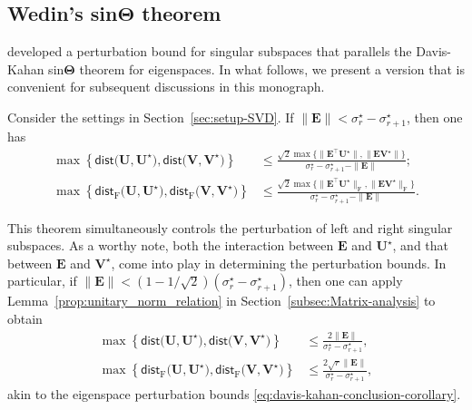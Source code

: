 \subsection{Wedin's sin$\bm\Theta$ theorem}

\citet{wedin1972perturbation} developed a perturbation bound for singular subspaces that parallels the Davis-Kahan sin$\bm{\Theta}$ theorem for eigenspaces. In what follows, we present a version that is convenient for subsequent discussions in this monograph.
%
\begin{theorem}
\label{thm:wedin}
Consider the settings in Section~\ref{sec:setup-SVD}. If $\|\bm{E}\|<\sigma_{r}^{\star}-\sigma_{r+1}^{\star}$, then one has
%
\begin{align*}
\max\left\{ \mathsf{dist}\big(\bm{U},\bm{U}^{\star}\big),\mathsf{dist}\big(\bm{V},\bm{V}^{\star}\big)\right\}
	& \leq\frac{ \sqrt{2} \max\big\{ \|\bm{E}^{\top}\bm{U}^{\star}\|,\|\bm{E}\bm{V}^{\star}\|\big\} }{\sigma_{r}^{\star}-\sigma_{r+1}^{\star}-\|\bm{E}\|};\\
\max\left\{ \mathsf{dist}_{\mathrm{F}}\big(\bm{U},\bm{U}^{\star}\big),\mathsf{dist}_{\mathrm{F}}\big(\bm{V},\bm{V}^{\star}\big)\right\}
	& \leq\frac{\sqrt{2}\max\big\{ \|\bm{E}^{\top}\bm{U}^{\star}\|_{\mathrm{F}},\|\bm{E}\bm{V}^{\star}\|_{\mathrm{F}}\big\} }{\sigma_{r}^{\star}-\sigma_{r+1}^{\star}-\|\bm{E}\|}.
\end{align*}
%
\end{theorem}




This theorem simultaneously controls the perturbation of left and right singular subspaces. As a worthy note, both the interaction between $\bm{E}$ and $\bm{U}^{\star}$, and that between $\bm{E}$ and $\bm{V}^{\star}$, come into play in determining the perturbation bounds.
In particular, if $\|\bm{E}\|< (1-1/\sqrt{2})(\sigma_{r}^{\star}-\sigma_{r+1}^{\star})$, then one can apply Lemma~\ref{prop:unitary_norm_relation} in Section~\ref{subsec:Matrix-analysis} to obtain
%
\begin{subequations}
\label{eq:wedin-simpler-friendly}
\begin{align}
\max\left\{ \mathsf{dist}\big(\bm{U},\bm{U}^{\star}\big),\mathsf{dist}\big(\bm{V},\bm{V}^{\star}\big)\right\}
	& \leq\frac{ 2 \|\bm{E}\| }{\sigma_{r}^{\star}-\sigma_{r+1}^{\star}}, \\
\max\left\{ \mathsf{dist}_{\mathrm{F}}\big(\bm{U},\bm{U}^{\star}\big),\mathsf{dist}_{\mathrm{F}}\big(\bm{V},\bm{V}^{\star}\big)\right\}
	& \leq \frac{ 2\sqrt{r}\|\bm{E}\| }{\sigma_{r}^{\star}-\sigma_{r+1}^{\star}},
\end{align}
\end{subequations}
%
akin to the eigenspace perturbation bounds \eqref{eq:davis-kahan-conclusion-corollary}.






